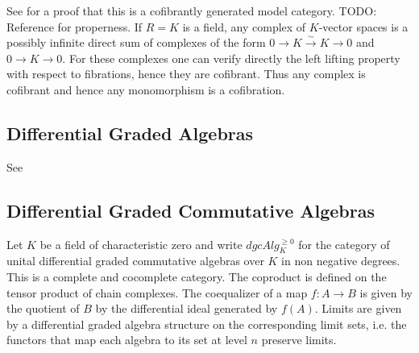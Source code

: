 \documentclass{scrartcl}
\theoremstyle{plain}
\theoremstyle{definition}
\DeclareMathOperator{\Ch}{Ch}
\let\xto\xrightarrow
\begin{document}
See \cite[Subsection 2.3]{hovey2007model} for a proof that this is a cofibrantly generated model category. TODO: Reference for properness.
If $R=K$ is a field, any complex of $K$-vector spaces is a possibly infinite direct sum of complexes of the form $0\to K\xto{\sim} K\to 0$ and $0\to K \to 0$. For these complexes one can verify directly the left lifting property with respect to fibrations, hence they are cofibrant. Thus any complex is cofibrant and hence any monomorphism is a cofibration. 


\subsection{Differential Graded Algebras}
See \cite{jf1997closed}

\subsection{Differential Graded Commutative Algebras}
Let $K$ be a field of characteristic zero and write $dgcAlg_K^{\geq 0}$ for the category of unital differential graded commutative algebras over $K$ in non negative degrees. This is a complete and cocomplete category. The coproduct is defined on the tensor product of chain complexes. The coequalizer of a map $f\colon A\to B$ is given by the quotient of $B$ by the differential ideal generated by $f(A)$. Limits are given by a differential graded algebra structure on the corresponding limit sets, i.e. the functors that map each algebra to its set at level $n$ preserve limits. 
\end{document}

